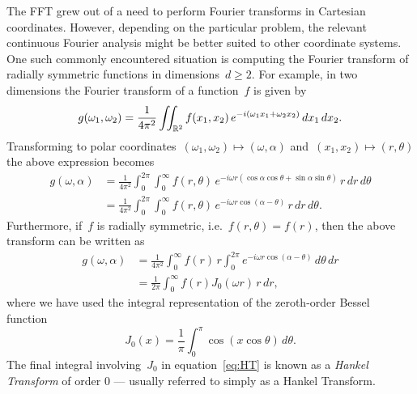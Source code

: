The FFT grew out of a need to perform Fourier transforms in Cartesian
coordinates. However, depending on the particular problem, the relevant
continuous Fourier analysis might be better suited to other coordinate systems.
One such commonly encountered situation is computing the Fourier transform of
radially symmetric functions in dimensions~$d \geq 2$. For example, in two
dimensions the Fourier transform of a function~$f$ is given by
\begin{equation}
  g(\omega_1, \omega_2) = \frac{1}{4\pi^2} \iint_{\mathbb{R}^2} f(x_1, x_2) \, 
  e^{-i(\omega_1 x_1 + \omega_2 x_2)}  \, dx_1 \, dx_2.
\end{equation}
Transforming to polar coordinates~$(\omega_1,\omega_2) \mapsto (\omega,\alpha)$
and~$(x_1,x_2) \mapsto (r,\theta)$ the above expression becomes
\begin{equation}
  \label{eq:ftpolar}
  \begin{aligned}
    g(\omega, \alpha) &= \frac{1}{4\pi^2} \int_0^{2\pi} \int_0^\infty
    f(r,\theta) \, 
    e^{-i \omega r (\cos\alpha \cos\theta + \sin\alpha \sin\theta) } 
    \, r \, dr \, d\theta \\
  &= \frac{1}{4\pi^2} \int_0^{2\pi} \int_0^\infty f(r,\theta) \, e^{-i \omega r \cos(\alpha-\theta) } \, r \, dr \, d\theta.
  \end{aligned}
\end{equation}
Furthermore, if~$f$ is radially symmetric, i.e.~$f(r, \theta) = f(r)$, then the
above transform can be written as
\begin{equation}
  \label{eq:HT}
  \begin{aligned}
  g(\omega,\alpha) &= \frac{1}{4\pi^2} \int_0^\infty f(r) \, r \int_0^{2\pi} 
  e^{-i \omega r \cos(\alpha - \theta) }  \, d\theta \, dr \\
  &= \frac{1}{2\pi} \int_0^\infty f(r) J_0(\omega r) \, r \, dr,
  \end{aligned}
\end{equation}
where we have used the integral representation of the zeroth-order Bessel
function~\cite{olver2010nist}
\begin{equation}
  J_0(x) 
  = \frac{1}{\pi} \int_0^\pi \cos \left( x \cos \theta \right) \, d\theta.
\end{equation}
The final integral involving~$J_0$ in equation~\eqref{eq:HT} is known as a
\emph{Hankel Transform} of order 0 --- usually referred to simply as a Hankel
Transform. 

